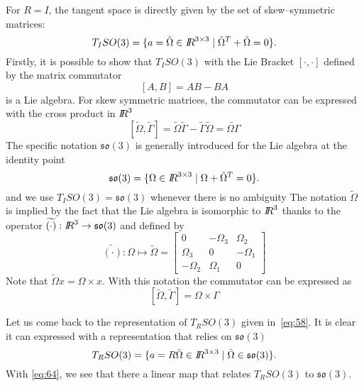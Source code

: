 For $R=I$, the tangent space is directly given by the set of  skew--symmetric matrices:
\begin{equation}
  \label{eq:58}
  T_ISO(3) = \{ a = \tilde \Omega\in \mbox{\rm $I\!\!R$}^{3\times 3} \mid \tilde \Omega^T + \tilde \Omega =0 \}.
\end{equation}
Firstly, it is possible to show that $T_ISO(3)$ with the Lie Bracket $[\cdot,\cdot]$ defined by the matrix commutator
\begin{equation}
  \label{eq:61}
  [A,B] = AB-BA
\end{equation}
is a Lie algebra. For skew symmetric matrices, the commutator can be expressed with the cross product in $\mbox{\rm $I\!\!R$}^3$
\begin{equation}
  \label{eq:62}
  [\tilde \Omega, \tilde \Gamma] = \tilde \Omega \tilde \Gamma - \tilde \Gamma \tilde \Omega = \widetilde{ \Omega \Gamma}
\end{equation}
The specific notation $\mathfrak{so}(3)$  is generally introduced for the Lie algebra at the identity point
\begin{equation}
  \label{eq:44}
  \mathfrak{so}(3) =\{\Omega\in \mbox{\rm $I\!\!R$}^{3\times 3} \mid \Omega + \tilde \Omega^T =0\}.
\end{equation}
and we use   $T_ISO(3) =  \mathfrak{so}(3)$ whenever there is no ambiguity  The notation $\tilde \Omega$ is implied by the fact that the Lie algebra is isomorphic to $\mbox{\rm $I\!\!R$}^3$ thanks to the operator $\widetilde{(\cdot)} :\mbox{\rm $I\!\!R$}^3 \rightarrow \mathfrak{so}(3)$ and defined by
\begin{equation}
  \label{eq:45}
 \widetilde{(\cdot)}: \Omega \mapsto \tilde \Omega =
  \begin{bmatrix}
    0 & -\Omega_3 & \Omega_2 \\
    \Omega_3 & 0 & -\Omega_1 \\
    -\Omega_2  & \Omega_1 & 0
  \end{bmatrix}
\end{equation}
Note that $\tilde \Omega x = \Omega \times x$. With this notation the commutator can be expressed as
\begin{equation}
  \label{eq:63}
  [\tilde \Omega, \tilde \Gamma] = \Omega \times \Gamma
\end{equation}

Let us come back to the representation of  $T_RSO(3)$ given in~\eqref{eq:58}. It is clear it can expressed with a representation that relies on $\mathfrak{so}(3)$
\begin{equation}
  \label{eq:64}
   T_RSO(3) = \{ a = R \tilde \Omega \in \mbox{\rm $I\!\!R$}^{3\times 3} \mid \tilde \Omega \in \mathfrak{so}(3) \}.
\end{equation}
With \eqref{eq:64}, we see that there a linear map that relates $T_RSO(3)$ to  $\mathfrak{so}(3)$.

